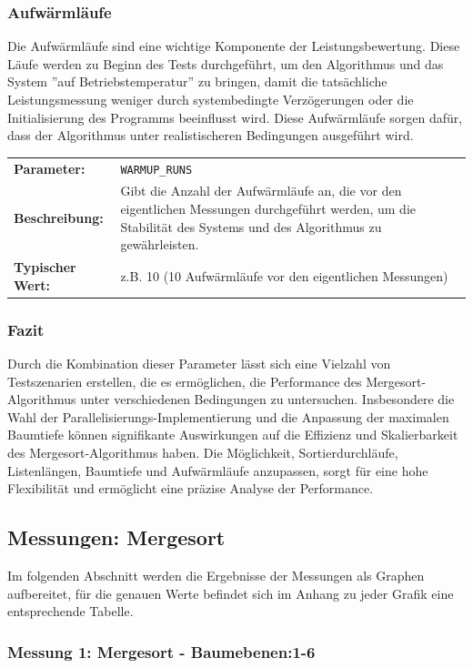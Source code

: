 \documentclass[fontsize=12pt,paper=a4,twoside=semi,parskip=half-,headsepline,headinclude]{scrreprt}
\begin{document}
\subsubsection{Aufwärmläufe}

Die Aufwärmläufe sind eine wichtige Komponente der Leistungsbewertung. Diese Läufe werden zu Beginn des Tests durchgeführt, um den Algorithmus und das System ''auf Betriebstemperatur'' zu bringen, damit die tatsächliche Leistungsmessung weniger durch systembedingte Verzögerungen oder die Initialisierung des Programms beeinflusst wird. Diese Aufwärmläufe sorgen dafür, dass der Algorithmus unter realistischeren Bedingungen ausgeführt wird.

\begin{tabularx}{\textwidth}{@{}lX@{}}
	\textbf{Parameter:}    & \texttt{WARMUP\_RUNS} \\
	\textbf{Beschreibung:} & Gibt die Anzahl der Aufwärmläufe an, die vor den eigentlichen Messungen durchgeführt werden, um die Stabilität des Systems und des Algorithmus zu gewährleisten. \\
	\textbf{Typischer Wert:} & z.B. 10 (10 Aufwärmläufe vor den eigentlichen Messungen)
\end{tabularx}

\subsubsection{Fazit}

Durch die Kombination dieser Parameter lässt sich eine Vielzahl von Testszenarien erstellen, die es ermöglichen, die Performance des Mergesort-Algorithmus unter verschiedenen Bedingungen zu untersuchen. Insbesondere die Wahl der Parallelisierungs-Implementierung und die Anpassung der maximalen Baumtiefe können signifikante Auswirkungen auf die Effizienz und Skalierbarkeit des Mergesort-Algorithmus haben. Die Möglichkeit, Sortierdurchläufe, Listenlängen, 
Baumtiefe und Aufwärmläufe anzupassen, sorgt für eine hohe Flexibilität und ermöglicht eine präzise Analyse der Performance.

\subsection{Messungen: Mergesort}

Im folgenden Abschnitt werden die Ergebnisse der Messungen 
als Graphen aufbereitet, für die genauen Werte befindet sich im 
Anhang zu jeder Grafik eine entsprechende Tabelle.

\subsubsection{Messung 1: Mergesort - Baumebenen:1-6}
\end{document}
